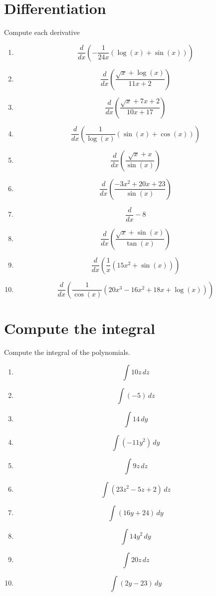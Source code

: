 \documentclass{article}
\begin{document}
        \section{Differentiation}
        Compute each derivative
        \begin{multicols}{1}
        \begin{enumerate}
        \item $$\frac{d}{d x}\left(- \frac{1}{24 x} \left(\log{\left (x \right )} + \sin{\left (x \right )}\right)\right)$$
\item $$\frac{d}{d x}\left(\frac{\sqrt{x} + \log{\left (x \right )}}{11 x + 2}\right)$$
\item $$\frac{d}{d x}\left(\frac{\sqrt{x} + 7 x + 2}{10 x + 17}\right)$$
\item $$\frac{d}{d x}\left(\frac{1}{\log{\left (x \right )}} \left(\sin{\left (x \right )} + \cos{\left (x \right )}\right)\right)$$
\item $$\frac{d}{d x}\left(\frac{\sqrt{x} + x}{\sin{\left (x \right )}}\right)$$
\item $$\frac{d}{d x}\left(\frac{- 3 x^{2} + 20 x + 23}{\sin{\left (x \right )}}\right)$$
\item $$\frac{d}{d x} -8$$
\item $$\frac{d}{d x}\left(\frac{\sqrt{x} + \sin{\left (x \right )}}{\tan{\left (x \right )}}\right)$$
\item $$\frac{d}{d x}\left(\frac{1}{x} \left(15 x^{2} + \sin{\left (x \right )}\right)\right)$$
\item $$\frac{d}{d x}\left(\frac{1}{\cos{\left (x \right )}} \left(20 x^{3} - 16 x^{2} + 18 x + \log{\left (x \right )}\right)\right)$$
        \end{enumerate}
        \end{multicols}
        

        \section{Compute the integral}
        Compute the integral of the polynomials.
        \begin{multicols}{1}
        \begin{enumerate}
        \item $$\int 10 z\, dz$$
\item $$\int \left(-5\right)\, dz$$
\item $$\int 14\, dy$$
\item $$\int \left(- 11 y^{2}\right)\, dy$$
\item $$\int 9 z\, dz$$
\item $$\int \left(23 z^{2} - 5 z + 2\right)\, dz$$
\item $$\int \left(16 y + 24\right)\, dy$$
\item $$\int 14 y^{2}\, dy$$
\item $$\int 20 z\, dz$$
\item $$\int \left(2 y - 23\right)\, dy$$
        \end{enumerate}
        \end{multicols}
        
\end{document}
